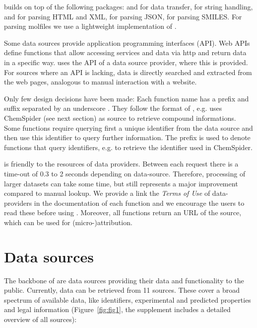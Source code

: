 \documentclass[article, shortnames]{jss}\usepackage[]{graphicx}\usepackage[]{color}
\begin{document}
 builds on top of the following  packages:
 \citep{lang_rcurl:_2015} and  \citep{wickham_httr} for data transfer,
 \cite{wickham_stringr:_2015} for string handling,
 \citep{wickham_xml2} and  \citep{wickham_rvest} for parsing HTML and XML,
 \citep{ooms_jsonlite_2014} for parsing JSON,
 \citep{guha_rcdk} for parsing SMILES.
For parsing molfiles we use a lightweight implementation of \citep{Grabner_Varmuza_Dehmer_2012}.

Some data sources provide application programming interfaces (API).
Web APIs define  functions that allow accessing services and data via http and return data in a specific way.
 uses the API of a data source provider, where this is provided.
For sources where an API is lacking, data is directly searched and extracted from the web pages, analogous to manual interaction with a website.

Only few design decisions have been made:
Each function name has a prefix and suffix separated by an underscore \citep{Chamberlain_Szocs_2013}.
They follow the format of , e.g.  uses ChemSpider (see next section) as source to retrieve compound informations.
Some functions require querying first a unique identifier from the data source and then use this identifier to query further information.
The prefix  is used to denote functions that query identifiers, e.g.  to retrieve the identifier used in ChemSpider.

 is friendly to the resources of data providers. 
Between each request there is a time-out of 0.3 to 2 seconds depending on data-source. 
Therefore, processing of larger datasets can take some time, but still represents a major improvement compared to manual lookup.
We provide a link the \emph{Terms of Use} of data-providers in the documentation of each function and we encourage the users to read these before using .
Moreover, all functions return an URL of the source, which can be used for \mbox{(micro-)attribution}.


\section[Data sources]{Data sources}
The backbone of  are data sources providing their data and functionality to the public.
Currently, data can be retrieved from 11 sources.
These cover a broad spectrum of available data, like identifiers, experimental and predicted properties and legal information (Figure~\ref{fig:fig1}, the supplement includes a detailed overview of all sources):
\end{document}
